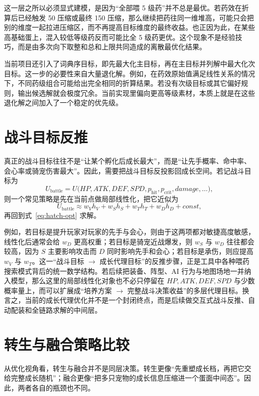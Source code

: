 这一层之所以必须显式建模，是因为“全部喂 5 级药”并不总是最优。若药效在折算后已经触发 50 压缩或最终 150 压缩，那么继续把药往同一维堆高，可能只会把别的维度一起拉进压缩区，而不再提高目标维度的最终收益。也正因为此，在某些高基础蛋上，混入较低等级药反而可能比全 5 级药更优。这个现象不是经验技巧，而是由多次向下取整和总和上限共同造成的离散最优化结果。

当前项目还引入了词典序目标，即先最大化主目标，再在主目标并列解中最大化次目标。这一步的必要性来自大量退化解。例如，在药效原始值满足线性关系的情况下，不同药级组合可能给出完全相同的折算结果。若没有次级目标或其它偏好规则，输出候选解就会极度冗余。当前实现里偏向更高等级素材，本质上就是在这些退化解之间加入了一个稳定的优先级。

\section{战斗目标反推}

真正的战斗目标往往不是“让某个孵化后成长最大”，而是“让先手概率、命中率、会心率或骑宠伤害最大”。因此，需要把战斗目标反投影回成长空间。若记战斗目标为
\begin{equation}
    U_{\mathrm{battle}} = U\bigl(HP,ATK,DEF,SPD,p_{\mathrm{hit}},p_{\mathrm{crit}},damage,\dots\bigr),
\end{equation}
则一个常见策略是先在当前点做局部线性化，把它近似为
\begin{equation}
    U_{\mathrm{battle}} \approx w_V h_V + w_S h_S + w_T h_T + w_D h_D + const,
\end{equation}
再回到式~\eqref{eq:hatch-opt} 求解。

例如，若目标是提升玩家对玩家的先手与会心，则由于这两项都对敏捷高度敏感，线性化后通常会给 $w_D$ 更高权重；若目标是骑宠近战爆发，则 $w_S$ 与 $w_D$ 往往都会较高，因为 $S$ 主要影响攻击而 $D$ 同时影响先手和会心；若目标是承伤，则应提高 $w_V$ 与 $w_T$。这一“战斗目标 $\rightarrow$ 成长代理目标”的反推步骤，正是工具中各种喂药搜索模式背后的统一数学结构。若后续把装备、阵型、AI 行为与地图场地一并纳入模型，那么这里的局部线性化对象也不必只停留在 $HP,ATK,DEF,SPD$ 与少数概率量上，而可以扩展成“培养方案 $\rightarrow$ 完整战斗决策收益”的多层代理目标。换言之，当前的成长代理优化并不是一个封闭终点，而是后续做交互式战斗反推、自动配装和全链路求解的中间层。

\section{转生与融合策略比较}

从优化视角看，转生与融合并不是同层决策。转生更像“先重塑成长档，再把它交给完整成长随机”；融合更像“把多只宠物的成长信息压缩进一个蛋面中间态”。因此，两者各自的瓶颈也不同。

